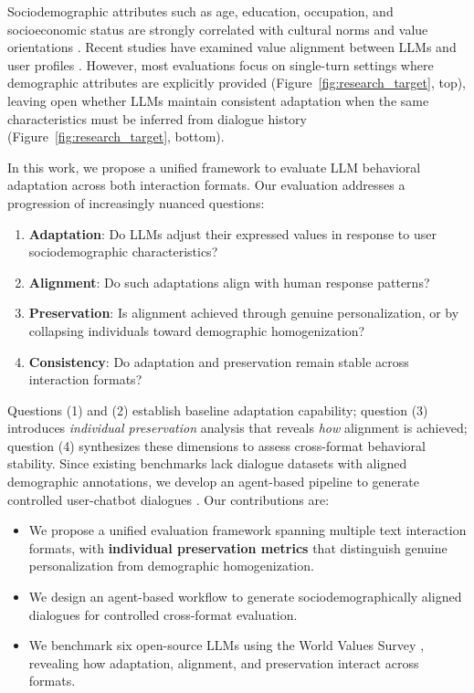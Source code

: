 \documentclass[final]{clv2025}
\begin{document}
Sociodemographic attributes such as age, education, occupation, and socioeconomic status are strongly correlated with cultural norms and value orientations \citep{Fung2016-re, genderandvalues, Gelfand2011-ei}. Recent studies have examined value alignment between LLMs and user profiles \citep{yao2024claveadaptiveframeworkevaluating, zhang2024heterogeneousvaluealignmentevaluation, sukiennik2025evaluationculturalvaluealignment}. However, most evaluations focus on single-turn settings where demographic attributes are explicitly provided (Figure~\ref{fig:research_target}, top), leaving open whether LLMs maintain consistent adaptation when the same characteristics must be inferred from dialogue history (Figure~\ref{fig:research_target}, bottom).

In this work, we propose a unified framework to evaluate LLM behavioral adaptation across both interaction formats. Our evaluation addresses a progression of increasingly nuanced questions:
\begin{enumerate}
    \item \textbf{Adaptation}: Do LLMs adjust their expressed values in response to user sociodemographic characteristics?
    \item \textbf{Alignment}: Do such adaptations align with human response patterns?
    \item \textbf{Preservation}: Is alignment achieved through genuine personalization, or by collapsing individuals toward demographic homogenization?
    \item \textbf{Consistency}: Do adaptation and preservation remain stable across interaction formats?
\end{enumerate}

Questions (1) and (2) establish baseline adaptation capability; question (3) introduces \textit{individual preservation} analysis that reveals \textit{how} alignment is achieved; question (4) synthesizes these dimensions to assess cross-format behavioral stability. Since existing benchmarks lack dialogue datasets with aligned demographic annotations, we develop an agent-based pipeline to generate controlled user-chatbot dialogues \citep{dam2024completesurveyllmbasedai}. Our contributions are:

\begin{itemize}
    \item We propose a unified evaluation framework spanning multiple text interaction formats, with \textbf{individual preservation metrics} that distinguish genuine personalization from demographic homogenization.
    \item We design an agent-based workflow to generate sociodemographically aligned dialogues for controlled cross-format evaluation.
    \item We benchmark six open-source LLMs using the World Values Survey \citep{Haerpfer2020-qe}, revealing how adaptation, alignment, and preservation interact across formats.
\end{itemize}
\end{document}
